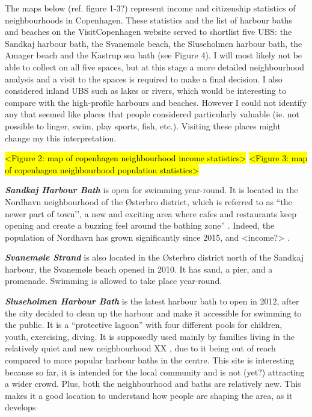 \documentclass{article}
\newcommand{\bisection}[1]{\textbf{\textit{#1}}}
\begin{document}
The maps below (ref. figure 1-3?) represent income and citizenship statistics of neighbourhoods in Copenhagen. These statistics and the list of harbour baths and beaches on the VisitCopenhagen website \parencite{visitcopenhagen} served to shortlist five UBS: the Sandkaj harbour bath, the Svanemøle beach, the Sluseholmen harbour bath, the Amager beach and the Kastrup sea bath (see Figure 4). I will most likely not be able to collect on all five spaces, but at this stage a more detailed neighbourhood analysis and a visit to the spaces is required to make a final decision. 
I also considered inland UBS such as lakes or rivers, which would be interesting to compare with the high-profile harbours and beaches. However I could not identify any that seemed like places that people considered particularly valuable (ie. not possible to linger, swim, play sports, fish, etc.). Visiting these places might change my this interpretation.

\hl{<Figure 2: map of copenhagen neighbourhood income statistics>}
\hl{<Figure 3: map of copenhagen neighbourhood population statistics>}

\bisection{Sandkaj Harbour Bath} is open for swimming year-round. It is located in the Nordhavn neighbourhood of the Østerbro district, which is referred to as ``the newer part of town’’, a new and exciting area where cafes and restaurants keep opening and create a buzzing feel around the bathing zone” \parencite{visitcopenhagenSandkaj}. Indeed, the population of Nordhavn has grown significantly since 2015, and <income?> \parencite{copenhagenStatbank}.

\bisection{Svanemøle Strand} is also located in the Østerbro district north of the Sandkaj harbour, the Svanemøle beach opened in 2010. It has sand, a pier, and a promenade. Swimming is allowed to take place year-round.

\bisection{Sluseholmen Harbour Bath} is the latest harbour bath to open in 2012, after the city decided to clean up the harbour and make it accessible for swimming to the public. It is a “protective lagoon” \parencite{visitcopenhagenSluseholmen} with four different pools for children, youth, exercising, diving. It is supposedly used mainly by families living in the relatively quiet and new neighbourhood XX \parencite{bak_2015}, due to it being out of reach compared to more popular harbour baths in the centre. This site is interesting because so far, it is intended for the local community and is not (yet?) attracting a wider crowd. Plus, both the neighbourhood and baths are relatively new. This makes it a good location to understand how people are shaping the area, as it develops
\end{document}
